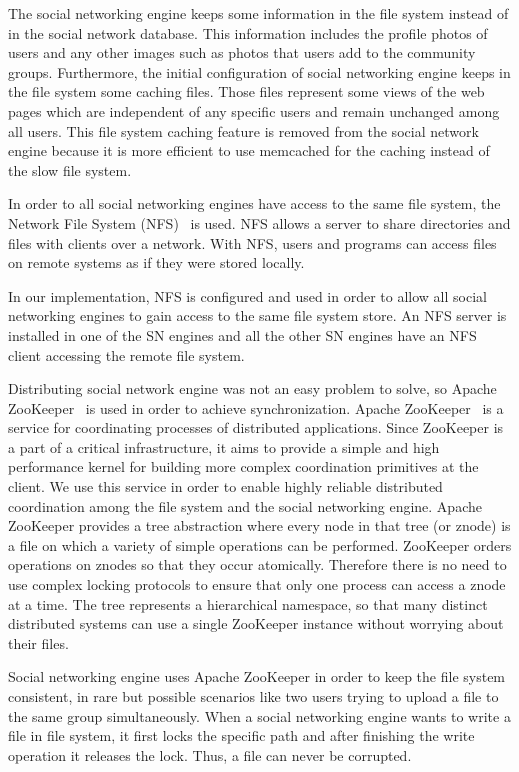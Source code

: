 The social networking engine keeps some information in the file system instead of in the social network database. This information includes the profile photos of users and any other images such as photos that users add to the community groups. Furthermore, the initial configuration of social networking engine keeps in the file system some caching files. Those files represent some views of the web pages which are independent of any specific users and remain unchanged among all users. This file system caching feature is removed from the social network engine because it is more efficient to use memcached for the caching instead of the slow file system.

In order to all social networking engines have access to the same file system, the Network File System (NFS)~\cite{sahni2015network} is used. NFS allows a server to share directories and files with clients over a network. With NFS, users and programs can access files on remote systems as if they were stored locally.

In our implementation, NFS is configured and used in order to allow all social networking engines to gain access to the same file system store. An NFS server is installed in one of the SN engines and all the other SN engines have an NFS client accessing the remote file system.   

Distributing social network engine was not an easy problem to solve, so Apache ZooKeeper~\cite{zookeeper_url} is used in order to achieve synchronization. 
Apache ZooKeeper~\cite{hunt2010zookeeper} is a service for coordinating processes of distributed applications. Since
ZooKeeper is a part of a critical infrastructure, it aims to provide a simple and high performance kernel
for building more complex coordination primitives at the client. 
We use this service in order to enable highly reliable distributed coordination among the file system and the social networking engine. 
Apache ZooKeeper provides a tree abstraction where every node in that tree (or znode) is a file on which a variety of simple operations can be performed. ZooKeeper orders operations on znodes so that they occur atomically. Therefore there is no need to use complex locking protocols to ensure that only one process can access a znode at a time. The tree represents a hierarchical namespace, so that many distinct distributed systems can use a single ZooKeeper instance without worrying about their files. 

Social networking engine uses Apache ZooKeeper in order to keep the file system consistent, in rare but possible scenarios like two users trying to upload a file to the same group simultaneously. When a social networking engine wants to write a file in file system, it first locks the specific path and after finishing the write operation it releases the lock. Thus, a file can never be corrupted.

